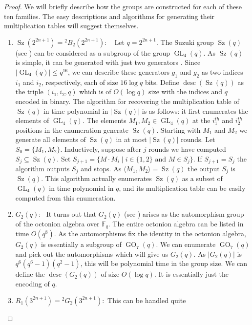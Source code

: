\documentclass{elsarticle}
\newcommand{\desc}{\mathop{\mathrm{desc}}}
\newcommand{\GL}{\mathop{\mathrm{GL}}\nolimits}
\newcommand{\Sz}{\mathop{\mathrm{Sz}}\nolimits}
\newcommand{\GO}{\mathop{\mathrm{GO}}\nolimits}
\newcommand{\F}{\mathbb{F}}
\renewcommand{\angle}[1]{\langle#1\rangle} %
\begin{document}
  \begin{proof}
    We will briefly describe how the groups are constructed for
    each of these ten families. The easy descriptions and algorithms
    for generating their multiplication tables will suggest themselves.
    \begin{enumerate}
    \item $\Sz(2^{2n+1})={}^2B_2(2^{2n+1})$: ~ Let $q=2^{2n+1}$. The Suzuki group
      $\Sz(q)$ (see \cite[Chapter 4.2]{Wilson-book}) can be considered as a
      subgroup of the group $\GL_4(q)$. As $\Sz(q)$ is simple, it can
      be generated with just two generators \cite{DMT}. Since
      $|\GL_4(q)|\le q^{16}$, we can describe these generators $g_1$
      and $g_2$ as two indices $i_1$ and $i_2$, respectively, each of
      size $16\log q$ bits. Define $\desc(\Sz(q))$ as the triple
      $(i_1,i_2,q)$ which is of $O(\log q)$ size with the indices and
      $q$ encoded in binary. The algorithm for recovering the
      multiplication table of $\Sz(q)$ in time polynomial in $|\Sz(q)|$
      is as follows: it first enumerates the elements of
      $\GL_4(q)$. The elements $M_1, M_2\in \GL_4(q)$ at the
      $i_1^{th}$ and $i_2^{th}$ positions in the enumeration generate
      $\Sz(q)$.  Starting with $M_1$ and $M_2$ we generate all elements
      of $\Sz(q)$ in at most $|\Sz(q)|$ rounds.  Let $S_0=\{M_1,M_2\}$.
      Inductively, suppose after $j$ rounds we have computed
      $S_j\subseteq \Sz(q)$.  Set $S_{j+1}=\{M\cdot M_i\mid i\in\{1,2\}
      \textrm{ and } M\in S_j\}$. If $S_{j+1}=S_j$ the algorithm
      outputs $S_j$ and stops. As $\angle{M_1,M_2}=\Sz(q)$ the output
      $S_j$ is $\Sz(q)$. This algorithm actually enumerates $\Sz(q)$ as
      a subset of $\GL_4(q)$ in time polynomial in $q$, and its
      multiplication table can be easily computed from this
      enumeration.
    \item $G_2(q)$:~ It turns out that $G_2(q)$ (see \cite[Chapter
      4.3]{Wilson-book}) arises as the automorphism group of the
      octonion algebra over $\F_q$. The entire octonion algebra can be
      listed in time $O(q^8)$. As the automorphisms fix the identity
      in the octonion algebra, $G_2(q)$ is essentially a subgroup of
      $\GO_7(q)$. We can enumerate $\GO_7(q)$ and pick out the
      automorphisms which will give us $G_2(q)$. As $|G_2(q)|$ is
      $q^6(q^6-1)(q^2-1)$, this will be polynomial time in the group
      size.  We can define the $\desc(G_2(q))$ of size $O(\log q)$. It
      is essentially just the encoding of $q$.
    \item $R_1(3^{2n+1})={}^2G_2(3^{2n+1})$:~This can be handled quite

\end{enumerate}
\end{proof}
\end{document}
